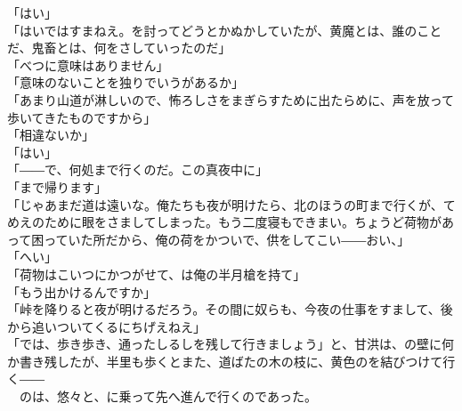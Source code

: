 \documentclass[
  paper=a5,
  fontsize=10pt,
  jafontsize=9.5pt,
  tate,                  %
  open_bracket_pos=nibu, %
]{jlreq}
\begin{document}
「はい」\\


「はいではすまねえ。を討ってどうとかぬかしていたが、黄魔とは、誰のことだ、鬼畜とは、何をさしていったのだ」\\


「べつに意味はありません」\\


「意味のないことを独りでいうがあるか」\\


「あまり山道が淋しいので、怖ろしさをまぎらすために出たらめに、声を放って歩いてきたものですから」\\


「相違ないか」\\


「はい」\\


「――で、何処まで行くのだ。この真夜中に」\\


「まで帰ります」\\


「じゃあまだ道は遠いな。俺たちも夜が明けたら、北のほうの町まで行くが、てめえのために眼をさましてしまった。もう二度寝もできまい。ちょうど荷物があって困っていた所だから、俺の荷をかついで、供をしてこい――おい、」\\


「へい」\\


「荷物はこいつにかつがせて、は俺の半月槍を持て」\\


「もう出かけるんですか」\\


「峠を降りると夜が明けるだろう。その間に奴らも、今夜の仕事をすまして、後から追いついてくるにちげえねえ」\\


「では、歩き歩き、通ったしるしを残して行きましょう」と、甘洪は、の壁に何か書き残したが、半里も歩くとまた、道ばたの木の枝に、黄色のを結びつけて行く――\\


　のは、悠々と、に乗って先へ進んで行くのであった。\\

\\
\end{document}
